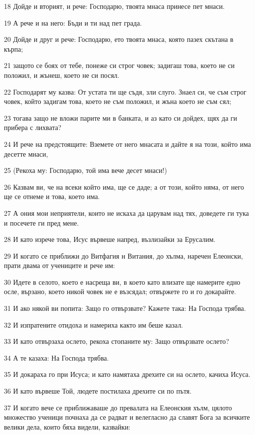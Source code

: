 \par 18 Дойде и вторият, и рече: Господарю, твоята мнаса принесе пет мнаси.
\par 19 А рече и на него: Бъди и ти над пет града.
\par 20 Дойде и друг и рече: Господарю, ето твоята мнаса, която пазех скътана в кърпа;
\par 21 защото се боях от тебе, понеже си строг човек; задигаш това, което не си положил, и жънеш, което не си посял.
\par 22 Господарят му казва: От устата ти ще съдя, зли слуго. Знаел си, че съм строг човек, който задигам това, което не съм положил, и жъна което не съм сял;
\par 23 тогава защо не вложи парите ми в банката, и аз като си дойдех, щях да ги прибера с лихвата?
\par 24 И рече на предстоящите: Вземете от него мнасата и дайте я на този, който има десетте мнаси,
\par 25 (Рекоха му: Господарю, той има вече десет мнаси!)
\par 26 Казвам ви, че на всеки който има, ще се даде; а от този, който няма, от него ще се отнеме и това, което има.
\par 27 А ония мои неприятели, които не искаха да царувам над тях, доведете ги тука и посечете ги пред мене.
\par 28 И като изрече това, Исус вървеше напред, възлизайки за Ерусалим.
\par 29 И когато се приближи до Витфагия н Витания, до хълма, наречен Елеонски, прати двама от учениците и рече им:
\par 30 Идете в селото, което е насреща ви, в което като влизате ще намерите едно осле, вързано, което никой човек не е възсядал; отвържете го и го докарайте.
\par 31 И ако някой ви попита: Защо го отвързвате? Кажете така: На Господа трябва.
\par 32 И изпратените отидоха и намериха както им беше казал.
\par 33 И като отвързаха ослето, рекоха стопаните му: Защо отвързвате ослето?
\par 34 А те казаха: На Господа трябва.
\par 35 И докараха го при Исуса; и като намятаха дрехите си на ослето, качиха Исуса.
\par 36 И като вървеше Той, людете постилаха дрехите си по пътя.
\par 37 И когато вече се приближаваше до превалата на Елеонския хълм, цялото множество ученици почнаха да се радват и велегласно да славят Бога за всичките велики дела, които бяха видели, казвайки:
